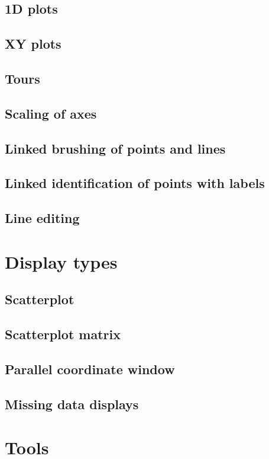 \documentclass[11pt]{article}
\begin{document}
\subsection{1D plots}
\subsection{XY plots}
\subsection{Tours}
\label{slbl:1DTour}
\subsection{Scaling of axes}
\label{slbl:Scaling}
\subsection{Linked brushing of points and lines}
\label{slbl:Color}
\subsection{Linked identification of points with labels}
\subsection{Line editing}

\section {Display types}
\subsection{Scatterplot}
\subsection{Scatterplot matrix}
\subsection{Parallel coordinate window}
\subsection{Missing data displays}

\newpage
\section{Tools}
\end{document}
